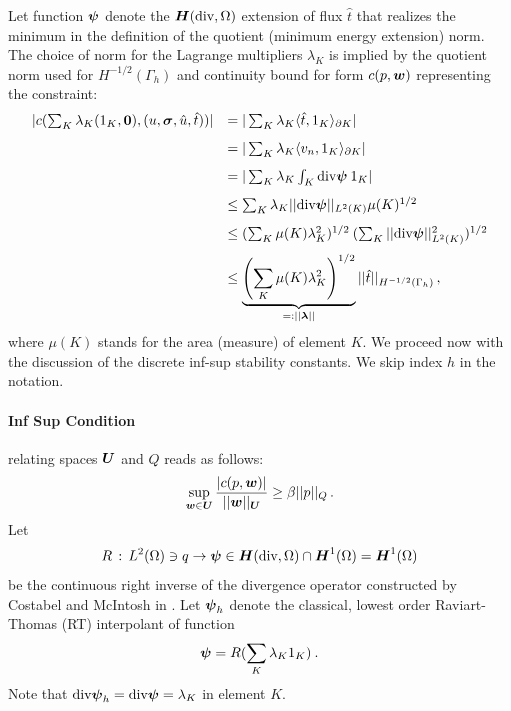 \documentclass[Proposal.tex]{subfiles}
\begin{document}
Let function $\boldsymbol\psi$ denote the $\mbox{\boldmath $H$}(\text{div},\Omega)$ extension of flux $\hat{t}$
that realizes the minimum in the definition of the quotient (minimum energy
extension) norm.
The choice of norm for the Lagrange multipliers $\lambda_K$ is implied
by the quotient norm used for $H^{-1/2}(\Gamma_h)$ and continuity
bound for form $c(p,\boldsymbol w)$ representing the constraint:
\begin{equation}
\begin{array}{lll}
| c(\sum_K \lambda_K (1_K,{\bf 0}),(u,\boldsymbol\sigma,\hat{u},\hat{t})) |
& = | \sum_K \lambda_K \langle \hat{t}, 1_K \rangle_{\partial K} | \\[8pt]
& = | \sum_K \lambda_K \langle v_n , 1_K \rangle_{\partial K} | \\[8pt]
& = | \sum_K \lambda_K \int_K \text{div} \boldsymbol\psi \: 1_K  | \\[8pt]
& \leq \sum_K  \lambda_K || \text{div} \boldsymbol\psi ||_{L^2(K)} \mu(K)^{1/2} \\[8pt]
& \leq (\sum_K \mu(K) \lambda_K^2)^{1/2} \: (\sum_K || \text{div} \boldsymbol\psi ||_{L^2(K)}^2 )^{1/2} \\[8pt]
& \leq \underbrace{\left(\sum_K \mu(K) \lambda_K^2\right)^{1/2}}_{=: || \boldsymbol\lambda ||} ||
\hat{t} ||_{H^{-1/2}(\Gamma_h)}\,,
\end{array}
\end{equation}
where $\mu(K)$ stands for the area (measure) of element $K$.
We proceed now with the discussion of the discrete inf-sup stability constants. We skip
index $h$ in the notation.

\paragraph{Inf Sup Condition} relating spaces $\boldsymbol U$ and $Q$ reads as follows:
\begin{equation}
   \sup_{\boldsymbol w \in \boldsymbol U} \frac{| c(p,\boldsymbol w) |}{|| \boldsymbol w ||_{\boldsymbol U}} \geq \beta ||
   p ||_Q\,.
\end{equation}
Let
\begin{equation}
R\, : \, L^2(\Omega) \ni q \to \boldsymbol\psi \in \mbox{\boldmath $H$}(\text{div},\Omega) \cap \mbox{\boldmath $H$}^1(\Omega)
=\mbox{\boldmath $H$}^1(\Omega)
\end{equation}
be
the continuous right inverse of the divergence operator constructed by
Costabel and McIntosh in \cite{CostabelMcIntosh}.
Let $\boldsymbol\psi_h$ denote the classical, lowest order Raviart-Thomas (RT) interpolant of
function
\begin{equation}
\boldsymbol\psi = R (\sum_K \lambda_K 1_K) \: .
\end{equation}
Note that $\text{div} \boldsymbol\psi_h = \text{div} \boldsymbol\psi = \lambda_K$ in element $K$.
\end{document}
